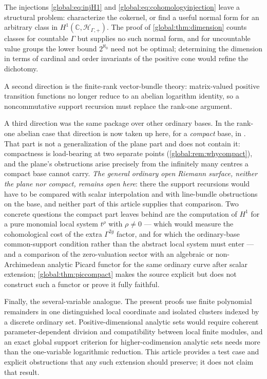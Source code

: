 \documentclass[11pt,letterpaper]{article}
\theoremstyle{definition}
\theoremstyle{remark}
\newcommand{\C}{\mathbb C}
\newcommand{\HP}{\mathscr H_{\Gamma,+}}
\numberwithin{equation}{section}
\begin{document}
The injections \eqref{global:eq:injH1} and \eqref{global:eq:cohomologyinjection} leave a structural problem: characterize the cokernel, or find a useful normal form for an arbitrary class in $H^1(\C,\HP)$. The proof of \cref{global:thm:dimension} counts classes for countable $\Gamma$ but supplies no such normal form, and for uncountable value groups the lower bound $2^{\aleph_0}$ need not be optimal; determining the dimension in terms of cardinal and order invariants of the positive cone would refine the dichotomy.

A second direction is the finite-rank vector-bundle theory: matrix-valued positive transition functions no longer reduce to an abelian logarithm identity, so a noncommutative support recursion must replace the rank-one argument.

A third direction was the same package over other ordinary bases. In the rank-one abelian case that direction is now taken up here, for a \emph{compact} base, in . That part is not a generalization of the plane part and does not contain it: compactness is load-bearing at two separate points (\cref{global:rem:whycompact}), and the plane's obstructions arise precisely from the infinitely many centres a compact base cannot carry. \emph{The general ordinary \emph{open} Riemann surface, neither the plane nor compact, remains open here}: there the support recursions would have to be compared with scalar interpolation and with line-bundle obstructions on the base, and neither part of this article supplies that comparison. Two concrete questions the compact part leaves behind are the computation of $H^1$ for a pure monomial local system $t^\rho$ with $\rho\ne0$ --- which would measure the cohomological cost of the extra $\Gamma^{2g}$ factor, and for which the ordinary-base common-support condition rather than the abstract local system must enter --- and a comparison of the zero-valuation sector with an algebraic or non-Archimedean analytic Picard functor for the same ordinary curve after scalar extension; \cref{global:thm:piccompact} makes the source explicit but does not construct such a functor or prove it fully faithful.

Finally, the several-variable analogue. The present proofs use finite polynomial remainders in one distinguished local coordinate and isolated clusters indexed by a discrete ordinary set. Positive-dimensional analytic sets would require coherent parameter-dependent division and compatibility between local finite modules, and an exact global support criterion for higher-codimension analytic sets needs more than the one-variable logarithmic reduction. This article provides a test case and explicit obstructions that any such extension should preserve; it does not claim that result.
\end{document}
